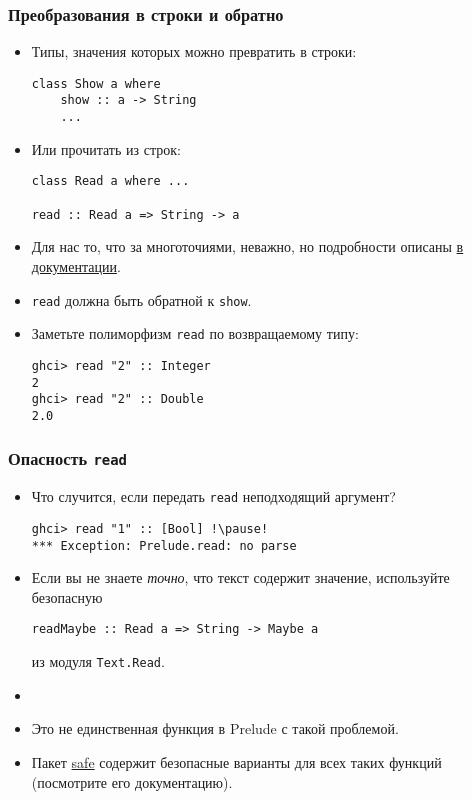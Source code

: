 \documentclass[10pt]{beamer}
\begin{document}
\begin{frame}[fragile]
  \frametitle{Преобразования в строки и обратно}
  \begin{itemize}
    \item
          Типы, значения которых можно превратить в строки:
          \begin{lstlisting}[basicstyle=\ttfamily\small]
class Show a where
    show :: a -> String 
    ...
\end{lstlisting}\pause
    \item Или прочитать из строк:
          \begin{lstlisting}[basicstyle=\ttfamily\small]
class Read a where ...

read :: Read a => String -> a
\end{lstlisting}\pause
    \item Для нас то, что за многоточиями, неважно, но подробности описаны \href{http://hackage.haskell.org/package/base-4.10.1.0/docs/Prelude.html#g:22}{в документации}.\pause
    \item \lstinline|read| должна быть обратной к \lstinline|show|.
    \item Заметьте полиморфизм \lstinline|read| по возвращаемому типу:
          \begin{lstlisting}[basicstyle=\ttfamily\small]
ghci> read "2" :: Integer
2
ghci> read "2" :: Double
2.0
\end{lstlisting}
  \end{itemize}
\end{frame}

\begin{frame}[fragile]
  \frametitle{Опасность \lstinline|read|}
  \begin{itemize}
    \item Что случится, если передать \lstinline|read| неподходящий аргумент?
          \begin{lstlisting}
ghci> read "1" :: [Bool] !\pause!
*** Exception: Prelude.read: no parse
\end{lstlisting}
    \item Если вы не знаете \emph{точно}, что текст содержит значение, используйте безопасную
          \begin{lstlisting}
readMaybe :: Read a => String -> Maybe a
\end{lstlisting}
          из модуля \lstinline|Text.Read|.
          \pause
    \item[]
    \item Это не единственная функция в Prelude с такой проблемой.
    \item Пакет \href{https://hackage.haskell.org/package/safe}{safe} содержит безопасные варианты для всех таких функций (посмотрите его документацию).
  \end{itemize}
\end{frame}
\end{document}
